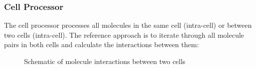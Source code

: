 \subsubsection{Cell Processor}
The cell processor processes all molecules in the same cell (intra-cell) or between two cells (intra-cell).
The reference approach is to iterate through all molecule pairs in both cells and calculate the interactions between them:
\begin{figure}
  \centering
  \caption{Schematic of molecule interactions between two cells}
\end{figure}

